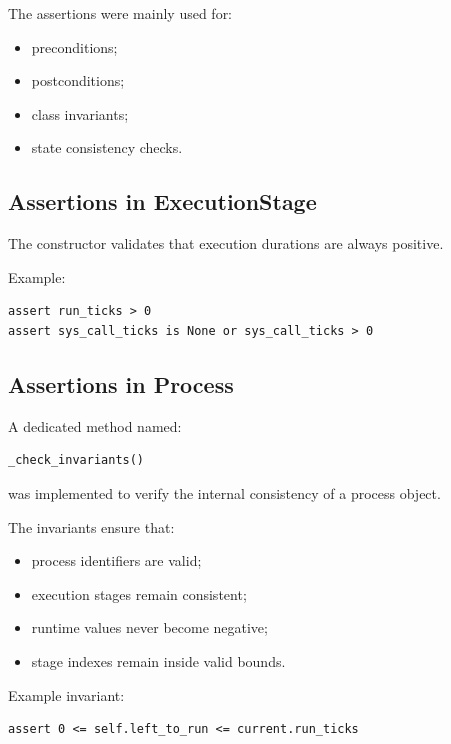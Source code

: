 \documentclass{article}
\begin{document}
The assertions were mainly used for:

\begin{itemize}
    \item preconditions;
    \item postconditions;
    \item class invariants;
    \item state consistency checks.
\end{itemize}

\subsection{Assertions in ExecutionStage}

The constructor validates that execution durations are always positive.

Example:

\begin{verbatim}
assert run_ticks > 0
assert sys_call_ticks is None or sys_call_ticks > 0
\end{verbatim}



\subsection{Assertions in Process}

A dedicated method named:

\begin{verbatim}
_check_invariants()
\end{verbatim}

was implemented to verify the internal consistency of a process object.

The invariants ensure that:

\begin{itemize}
    \item process identifiers are valid;
    \item execution stages remain consistent;
    \item runtime values never become negative;
    \item stage indexes remain inside valid bounds.
\end{itemize}

Example invariant:

\begin{verbatim}
assert 0 <= self.left_to_run <= current.run_ticks
\end{verbatim}
\end{document}
